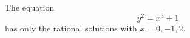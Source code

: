 \begin{proposition}
    The equation
\[
    y^2=x^3+1
\]
    has only the rational solutions with $x=0,-1,2$.
\end{proposition}
